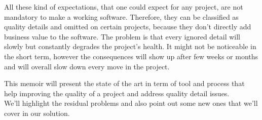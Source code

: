 All these kind of expectations, that one could expect for any project, are
not mandatory to make a working software.
Therefore, they can be classified as quality details and omitted on certain
projects, because they don't directly add business value to the software.
The problem is that every ignored detail will slowly but constantly degrades
the project's health.
It might not be noticeable in the short term, however the consequences will
show up after few weeks or months and will overall slow down every move in
the project.

This memoir will present the state of the art in term of tool
and process that help improving the quality of a project and address quality
detail issues. \\
We'll highlight the residual problems and also point out some new ones that
we'll cover in our solution.

